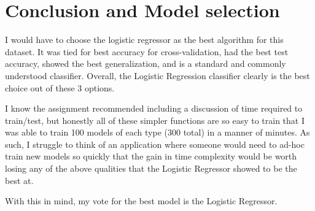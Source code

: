 \documentclass[12pt]{article}
\begin{document}
\section{Conclusion and Model selection}
I would have to choose the logistic regressor as the best algorithm for this dataset. It was tied for best accuracy for cross-validation,
had the best test accuracy, showed the best generalization, and is a standard and commonly understood classifier. Overall,
the Logistic Regression classifier clearly is the best choice out of these 3 options.

I know the 
assignment recommended including a discussion of time required to train/test, but honestly all of these simpler functions are so 
easy to train that I was able to train 100 models of each type (300 total) in a manner of minutes. As such, I struggle to think of 
an application where someone would need to ad-hoc train new models so quickly that the gain in time complexity would be worth losing
any of the above qualities that the Logistic Regressor showed to be the best at. 

With this in mind, my vote for the best model is the Logistic Regressor.
\end{document}
